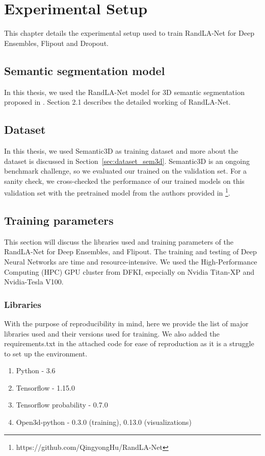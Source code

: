 

    \chapter{Experimental Setup}
    This chapter details the experimental setup used to train RandLA-Net for Deep Ensembles, Flipout and Dropout.

    \section{Semantic segmentation model}
    In this thesis, we used the RandLA-Net model for 3D semantic segmentation proposed in \cite{Hu_2020_CVPR_Randla}.
    Section 2.1 describes the detailed working of RandLA-Net. 

    \section{Dataset}
    In this thesis, we used Semantic3D as training dataset and more about the dataset is discussed in Section~\ref{sec:dataset_sem3d}.
    Semantic3D is an ongoing benchmark challenge, so we evaluated our trained on the validation set.
    For a sanity check, we cross-checked the performance of our trained models on this validation set with the pretrained model from the authors provided in \footnote[1]{https://github.com/QingyongHu/RandLA-Net}.

    \section{Training parameters}
    This section will discuss the libraries used and training parameters of the RandLA-Net for Deep Ensembles, and Flipout.    The training and testing of Deep Neural Networks are time and resource-intensive.
    We used the High-Performance Computing (HPC) GPU cluster from DFKI, especially on Nvidia Titan-XP and Nvidia-Tesla V100.
    \subsection*{Libraries}
    With the purpose of reproducibility in mind, here we provide the list of major libraries used and their versions used for training.
    We also added the requirements.txt in the attached code for ease of reproduction as it is a struggle to set up the environment.
    \begin{enumerate}
        \item Python - 3.6
        \item Tensorflow - 1.15.0
        \item Tensorflow probability - 0.7.0
        \item Open3d-python - 0.3.0 (training), 0.13.0 (visualizations)
    \end{enumerate}
    
